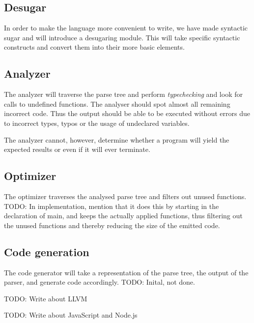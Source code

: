 \subsection{Desugar}
In order to make the language more convenient to write, we have made syntactic sugar and will introduce a desugaring module. This will take specific syntactic constructs and convert them into their more basic elements.

\subsection{Analyzer}
The analyzer will traverse the parse tree and perform \emph{typechecking} and look for calls to undefined functions. The analyser should spot almost all remaining incorrect code. Thus the output should be able to be executed without errors due to incorrect types, typos or the usage of undeclared variables.

The analyzer cannot, however, determine whether a program will yield the expected results or even if it will ever terminate.


\subsection{Optimizer}
The optimizer traverses the analysed parse tree and filters out unused functions. 
TODO: In implementation, mention that it does this by starting in the declaration of main, and keeps the actually applied functions, thus filtering out the unused functions and thereby reducing the size of the emitted code. 


\subsection{Code generation}
The code generator will take a representation of the
parse tree, the output of the parser, and generate code
accordingly. TODO: Inital, not done.

TODO: Write about LLVM

TODO: Write about JavaScript and Node.js
